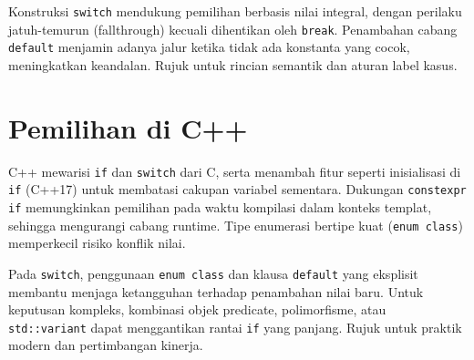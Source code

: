 \documentclass[../main.tex]{subfiles}
\begin{document}
Konstruksi \texttt{switch} mendukung pemilihan berbasis nilai integral, dengan perilaku jatuh-temurun (fallthrough) kecuali dihentikan oleh \texttt{break}. Penambahan cabang \texttt{default} menjamin adanya jalur ketika tidak ada konstanta yang cocok, meningkatkan keandalan. Rujuk \textcite{gnu-c-manual,iso-c-draft-n1570} untuk rincian semantik dan aturan label kasus.

\section{Pemilihan di C++}
C++ mewarisi \texttt{if} dan \texttt{switch} dari C, serta menambah fitur seperti inisialisasi di \texttt{if} (C++17) untuk membatasi cakupan variabel sementara. Dukungan \texttt{constexpr if} memungkinkan pemilihan pada waktu kompilasi dalam konteks templat, sehingga mengurangi cabang runtime. Tipe enumerasi bertipe kuat (\texttt{enum class}) memperkecil risiko konflik nilai.

Pada \texttt{switch}, penggunaan \texttt{enum class} dan klausa \texttt{default} yang eksplisit membantu menjaga ketangguhan terhadap penambahan nilai baru. Untuk keputusan kompleks, kombinasi objek predicate, polimorfisme, atau \texttt{std::variant} dapat menggantikan rantai \texttt{if} yang panjang. Rujuk \textcite{cpp-reference} untuk praktik modern dan pertimbangan kinerja.
\end{document}
